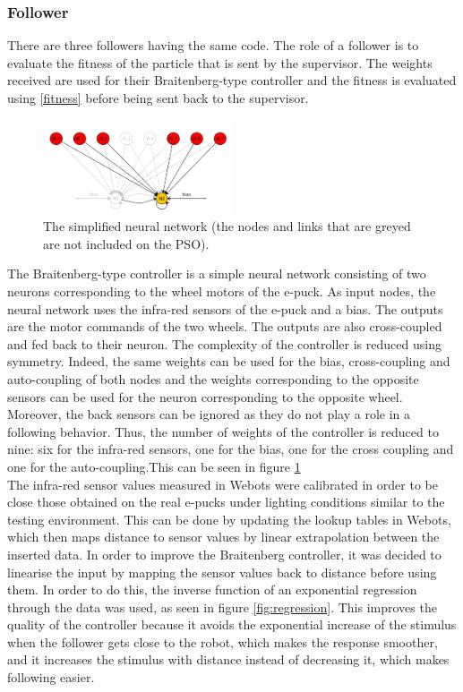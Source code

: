 \documentclass[a4paper, 10pt, conference]{ieeeconf}      %
\begin{document}
\subsubsection{Follower}
There are three followers having the same code. The role of a follower is to evaluate the fitness of the particle that is sent by the supervisor. The weights received are used for their Braitenberg-type controller and the fitness is evaluated using \ref{fitness} before being sent back to the supervisor.

\begin{figure}[thpb]
      \centering
      \includegraphics[width = 0.5\textwidth]{images/NNsimplified.png}
      \caption{The simplified neural network (the nodes and links that are greyed are not included on the PSO).}
      \label{fig:nnsimplified}
\end{figure}

The Braitenberg-type controller is a simple neural network consisting of two neurons corresponding to the wheel motors of the e-puck. As input nodes, the neural network uses the infra-red sensors of the e-puck  and a bias. The outputs are the motor commands of the two wheels. The outputs are also cross-coupled and fed back to their neuron. The complexity of the controller is reduced using symmetry. Indeed, the same weights can be used for the bias, cross-coupling and auto-coupling of both nodes and the weights corresponding to the opposite sensors can be used for the neuron corresponding to the opposite wheel. Moreover, the back sensors can be ignored as they do not play a role in a following behavior. Thus, the number of weights of the controller is reduced to nine: six for the infra-red sensors, one for the bias, one for the cross coupling and one for the auto-coupling.This can be seen in figure \ref{fig:nnsimplified}\\
The infra-red sensor values measured in Webots were calibrated in order to be close those obtained on the real e-pucks under lighting conditions similar to the testing environment. This can be done by updating the lookup tables in Webots, which then maps distance to sensor values by linear extrapolation between the inserted data. In order to improve the Braitenberg controller, it was decided to linearise the input by mapping the sensor values back to distance before using them. In order to do this, the inverse function of an exponential regression through the data was used, as seen in figure \ref{fig:regression}. This improves the quality of the controller because it avoids the exponential increase of the stimulus when the follower gets close to the robot, which makes the response smoother, and it increases the stimulus with distance instead of decreasing it, which makes following easier.\\
\end{document}
